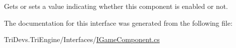 Gets or sets a value indicating whether this component is enabled or not. 



The documentation for this interface was generated from the following file\-:\begin{DoxyCompactItemize}
\item 
Tri\-Devs.\-Tri\-Engine/\-Interfaces/\hyperlink{_i_game_component_8cs}{I\-Game\-Component.\-cs}\end{DoxyCompactItemize}
